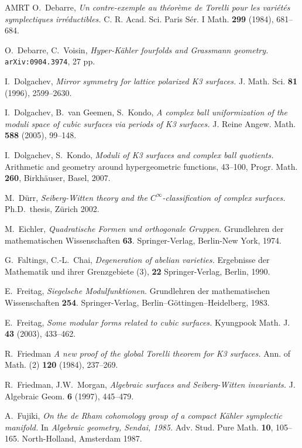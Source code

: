 \documentclass[a4paper,11pt]{article}
\begin{document}
\begin{thebibliography}{AMRT}
 O.~Debarre, {\it Un contre-exemple au th\'eor\`eme
  de Torelli pour les vari\'et\'es symplectiques irr\'eductibles.}
  C. R. Acad. Sci. Paris S\'er. I Math. {\bf 299} (1984), 681--684.

 O.~Debarre, C.~Voisin, {\it Hyper-K\"ahler fourfolds
  and Grassmann geometry.} {\tt arXiv:0904.3974}, 27 pp.

 I.~Dolgachev, {\it Mirror symmetry for lattice
  polarized K3 surfaces.} J. Math. Sci. {\bf 81} (1996),
  2599--2630.

 I.~Dolgachev, B.~van Geemen, S.~Kondo, {\it A
  complex ball uniformization of the moduli space of cubic surfaces
  via periods of K3 surfaces.} J. Reine Angew. Math. {\bf 588} (2005),
  99--148.

 I.~Dolgachev, S.~Kondo, {\it Moduli of K3 surfaces
and complex ball quotients.} Arithmetic and geometry around
hypergeometric functions, 43--100, Progr. Math. {\bf 260}, Birkh\"auser,
Basel, 2007.

 M.~D\"urr, {\it Seiberg-Witten theory and the
  $C^{\infty}$-classification of complex surfaces.} Ph.D.\ thesis,
  Z\"urich 2002.

 M.~Eichler, {\it Quadratische Formen und orthogonale
  Gruppen.} Grund\-lehren der mathematischen Wissenschaften {\bf
  63}. Springer-Verlag, Berlin-New York, 1974.

 G.~Faltings, C.-L.~Chai, {\it Degeneration of abelian
  varieties.} Ergebnisse der Mathematik und ihrer Grenzgebiete (3),
  {\bf 22} Springer-Verlag, Berlin, 1990.

 E.~Freitag, {\it Siegelsche Modulfunktionen.}
  Grund\-lehren der mathematischen Wissenschaften {\bf 254}.
  Springer-Verlag, Berlin--G\"ottingen--Heidelberg, 1983.

 E.~Freitag, {\it Some modular forms related to cubic
  surfaces.}  Kyungpook Math. J.  {\bf 43} (2003), 433--462.

 R.~Friedman {\it A new proof of the global Torelli
  theorem for K3 surfaces.}  Ann. of Math. (2) {\bf 120}
  (1984), 237--269.

 R.~Friedman, J.W.~Morgan, {\it Algebraic surfaces and
  Seiberg-Witten invariants.}  J. Algebraic Geom. {\bf 6} (1997),
  445--479.

 A.~Fujiki, {\it On the de Rham cohomology group of
  a compact K\"ahler symplectic manifold.}  In {\it Algebraic
  geometry, Sendai, 1985.} Adv. Stud. Pure Math. {\bf
  10}, 105--165. North-Holland, Amsterdam 1987.


\end{thebibliography}
\end{document}
